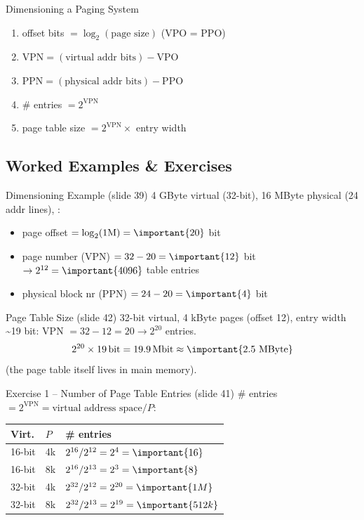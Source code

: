 \begin{KR}{Dimensioning a Paging System}
    \begin{enumerate}
        \item offset bits $= \log_2(\text{page size})$ \quad(VPO = PPO)
        \item $\text{VPN} = (\text{virtual addr bits}) - \text{VPO}$
        \item $\text{PPN} = (\text{physical addr bits}) - \text{PPO}$
        \item \# entries $= 2^{\text{VPN}}$
        \item page table size $= 2^{\text{VPN}} \times$ entry width
    \end{enumerate}
\end{KR}

\subsection{Worked Examples \& Exercises}

\begin{example2}{Dimensioning Example (slide 39)}
    4 GByte virtual (32-bit), 16 MByte physical (24 addr lines), :
    \tcblower
    \begin{itemize}
        \item page offset $= \log_2(1\text{M}) = \important{20}$ bit
        \item page number (VPN) $= 32 - 20 = \important{12}$ bit $\to 2^{12} =
              \important{4096}$ table entries
        \item physical block nr (PPN) $= 24 - 20 = \important{4}$ bit
    \end{itemize}
\end{example2}

\begin{example2}{Page Table Size (slide 42)}
    32-bit virtual, 4 kByte pages (offset 12), entry width \textasciitilde19 bit:
    \tcblower
    VPN $= 32-12 = 20 \to 2^{20}$ entries.
    $$2^{20} \times 19\,\text{bit} = 19.9\,\text{Mbit} \approx \important{2.5\ \text{MByte}}$$
    (the page table itself lives in main memory).
\end{example2}

\begin{example2}{Exercise 1 -- Number of Page Table Entries (slide 41)}
    \# entries $= 2^{\text{VPN}} = \text{virtual address space} / P$:
    \tcblower
    \begin{tabular}{l|l|l}
        Virt. & $P$ & \# entries \\\hline
        16-bit & 4k & $2^{16}/2^{12} = 2^4 = \important{16}$ \\
        16-bit & 8k & $2^{16}/2^{13} = 2^3 = \important{8}$ \\
        32-bit & 4k & $2^{32}/2^{12} = 2^{20} = \important{1M}$ \\
        32-bit & 8k & $2^{32}/2^{13} = 2^{19} = \important{512k}$ \\
    \end{tabular}
\end{example2}

